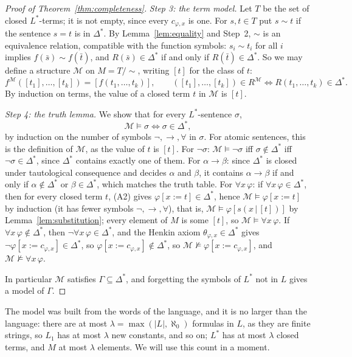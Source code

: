 \begin{proof}[Proof of Theorem~\ref{thm:completeness}]
\emph{Step 3: the term model.} Let $T$ be the set of closed $L^*$-terms; it is not empty, since every $c_{\varphi,x}$ is one. For $s,t\in T$ put $s\sim t$ if the sentence $s=t$ is in $\Delta^*$. By Lemma~\ref{lem:equality} and Step~2, $\sim$ is an equivalence relation, compatible with the function symbols: $s_i\sim t_i$ for all $i$ implies $f(\bar s)\sim f(\bar t)$, and $R(\bar s)\in\Delta^*$ if and only if $R(\bar t)\in\Delta^*$. So we may define a structure $\mathcal M$ on $M=T/{\sim}$, writing $[t]$ for the class of $t$:
\[
f^{\mathcal M}([t_1],\dots,[t_k])=[f(t_1,\dots,t_k)],\qquad ([t_1],\dots,[t_k])\in R^{\mathcal M}\iff R(t_1,\dots,t_k)\in\Delta^*.
\]
By induction on terms, the value of a closed term $t$ in $\mathcal M$ is $[t]$.

\emph{Step 4: the truth lemma.} We show that for every $L^*$-sentence $\sigma$,
\[
\mathcal M\models\sigma\iff\sigma\in\Delta^*,
\]
by induction on the number of symbols $\neg,\to,\forall$ in $\sigma$. For atomic sentences, this is the definition of $\mathcal M$, as the value of $t$ is $[t]$. For $\neg\sigma$: $\mathcal M\models\neg\sigma$ iff $\sigma\notin\Delta^*$ iff $\neg\sigma\in\Delta^*$, since $\Delta^*$ contains exactly one of them. For $\alpha\to\beta$: since $\Delta^*$ is closed under tautological consequence and decides $\alpha$ and $\beta$, it contains $\alpha\to\beta$ if and only if $\alpha\notin\Delta^*$ or $\beta\in\Delta^*$, which matches the truth table. For $\forall x\,\varphi$: if $\forall x\,\varphi\in\Delta^*$, then for every closed term $t$, (A2) gives $\varphi[x:=t]\in\Delta^*$, hence $\mathcal M\models\varphi[x:=t]$ by induction (it has fewer symbols $\neg,\to,\forall$), that is, $\mathcal M\models\varphi[s(x\,|\,[t])]$ by Lemma~\ref{lem:substitution}; every element of $M$ is some $[t]$, so $\mathcal M\models\forall x\,\varphi$. If $\forall x\,\varphi\notin\Delta^*$, then $\neg\forall x\,\varphi\in\Delta^*$, and the Henkin axiom $\theta_{\varphi,x}\in\Delta^*$ gives $\neg\varphi[x:=c_{\varphi,x}]\in\Delta^*$, so $\varphi[x:=c_{\varphi,x}]\notin\Delta^*$, so $\mathcal M\not\models\varphi[x:=c_{\varphi,x}]$, and $\mathcal M\not\models\forall x\,\varphi$.

In particular $\mathcal M$ satisfies $\Gamma\subseteq\Delta^*$, and forgetting the symbols of $L^*$ not in $L$ gives a model of $\Gamma$.
\end{proof}

The model was built from the words of the language, and it is no larger than the language: there are at most $\lambda=\max(|L|,\aleph_0)$ formulas in $L$, as they are finite strings, so $L_1$ has at most $\lambda$ new constants, and so on; $L^*$ has at most $\lambda$ closed terms, and $M$ at most $\lambda$ elements. We will use this count in a moment.

